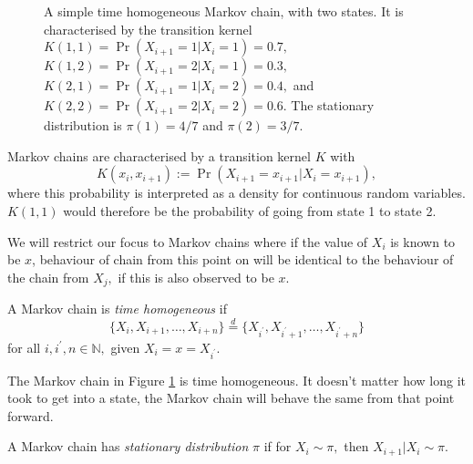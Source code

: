 \begin{figure}[htbp]
    \centering
    \caption{
        A simple time homogeneous Markov chain, with two states.
        It is characterised by the transition kernel
        $K(1, 1) = \Pr(X_{i + 1} = 1 | X_i = 1) = 0.7,$
        $K(1, 2) = \Pr(X_{i + 1} = 2 | X_i = 1) = 0.3,$
        $K(2, 1) = \Pr(X_{i + 1} = 1 | X_i = 2) = 0.4,$ and
        $K(2, 2) = \Pr(X_{i + 1} = 2 | X_i = 2) = 0.6.$ The stationary
        distribution is $\pi(1) = 4/7$ and $\pi(2) = 3/7.$
    }
    \label{fig:MC}
\end{figure}

Markov chains are characterised by a transition kernel $K$ with
$$K(x_i, x_{i + 1}) := \Pr(X_{i + 1} = x_{i + 1} | X_i = x_{i + 1}),$$
where this probability is interpreted as a density for continuous random
variables. $K(1, 1)$ would therefore be the probability of going from state 1
to state 2.

We will restrict our focus to Markov chains where
if the value of $X_i$ is known to be $x$, behaviour of chain from this point on
will be identical to the behaviour of the chain from $X_j,$ if this is also
observed to be $x$.

\begin{definition}
    A Markov chain is \emph{time homogeneous} if
    $$
        \{X_i, X_{i+1}, \dots, X_{i + n}\}
        \overset{d}{=} \{X_{i^\prime}, X_{i^\prime+1}, \dots, X_{i^\prime + n}\}
    $$
    for all $i, i^\prime, n \in \mathbb{N},$ given $X_i = x = X_{i^\prime}.$
\end{definition}

The Markov chain in Figure \ref{fig:MC} is time homogeneous. It doesn't
matter how long it took to get into a state, the Markov chain will behave the
same from that point forward.

\begin{definition}
    A Markov chain has \emph{stationary distribution} $\pi$ if for $X_i \sim \pi,$
    then $X_{i + 1} | X_i \sim \pi.$
\end{definition}

